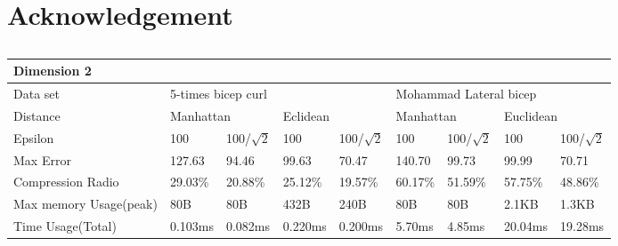 \documentclass[10pt, conference, compsocconf]{IEEEtran}
\begin{document}
\section*{Acknowledgement}
\begin{table*}[]
    \caption{}
    \begin{tabular}{|l|l|l|l|l|l|l|l|l|}
    \hline
    \multicolumn{9}{|l|}{Dimension 2}                                                                                                                         \\ \hline
    Data set               & \multicolumn{4}{l|}{5-times bicep curl}                        & \multicolumn{4}{l|}{Mohammad Lateral bicep}                     \\ \hline
    Distance               & \multicolumn{2}{l|}{Manhattan} & \multicolumn{2}{l|}{Eclidean} & \multicolumn{2}{l|}{Manhattan} & \multicolumn{2}{l|}{Euclidean} \\ \hline
    Epsilon                & 100          & 100/$\sqrt{2}$  & 100         & 100/$\sqrt{2}$  & 100        & 100/$\sqrt{2}$    & 100        & 100/$\sqrt{2}$    \\ \hline
    Max Error              & 127.63       & 94.46           & 99.63       & 70.47           & 140.70     & 99.73             & 99.99      & 70.71             \\ \hline
    Compression Radio      & 29.03\%      & 20.88\%         & 25.12\%     & 19.57\%         & 60.17\%    & 51.59\%           & 57.75\%    & 48.86\%           \\ \hline
    Max memory Usage(peak) & 80B          & 80B             & 432B        & 240B            & 80B        & 80B               & 2.1KB      & 1.3KB             \\ \hline
    Time Usage(Total)      & 0.103ms      & 0.082ms         & 0.220ms     & 0.200ms         & 5.70ms     & 4.85ms            & 20.04ms    & 19.28ms           \\ \hline
    \end{tabular}
\end{table*}
\end{document}
